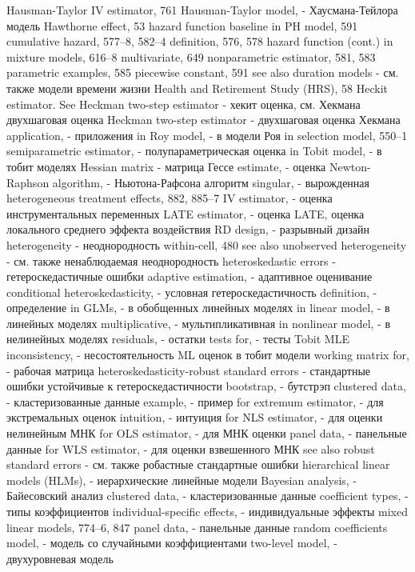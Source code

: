 Hausman-Taylor IV estimator, 761 
Hausman-Taylor model, - Хаусмана-Тейлора модель 
Hawthorne effect, 53
hazard function
baseline in PH model, 591 cumulative hazard, 577–8, 582–4 definition, 576, 578
hazard function (cont.)
in mixture models, 616–8 multivariate, 649
nonparametric estimator, 581, 583 parametric examples, 585 piecewise constant, 591
see also duration models - см. также модели времени жизни
Health and Retirement Study (HRS), 58
Heckit estimator. See Heckman two-step estimator - хекит оценка, см. Хекмана двухшаговая оценка 
Heckman two-step estimator - двухшаговая оценка Хекмана 
application, - приложения
in Roy model, - в модели Роя
in selection model, 550–1 
semiparametric estimator, - полупараметрическая оценка 
in Tobit model, - в тобит моделях
Hessian matrix - матрица Гессе
estimate, - оценка
Newton-Raphson algorithm, - Ньютона-Рафсона алгоритм 
singular, - вырожденная
heterogeneous treatment effects, 882, 885–7 
IV estimator, - оценка инструментальных переменных 
LATE estimator, - оценка LATE, оценка локального среднего эффекта воздействия
RD design, - разрывный дизайн
heterogeneity - неоднородность
within-cell, 480
see also unobserved heterogeneity - см. также ненаблюдаемая неоднородность
heteroskedastic errors - гетероскедастичные ошибки
adaptive estimation, - адаптивное оценивание
conditional heteroskedasticity, - условная гетероскедастичность 
definition, - определение
in GLMs, - в обобщенных линейных моделях
in linear model, - в линейных моделях 
multiplicative, - мультипликативная
in nonlinear model, - в нелинейных моделях 
residuals, - остатки
tests for, - тесты
Tobit MLE inconsistency, - несостоятельность ML оценок в тобит модели 
working matrix for, - рабочая матрица
heteroskedasticity-robust standard errors - стандартные ошибки устойчивые к гетероскедастичности
bootstrap, - бутстрэп
clustered data, - кластеризованные данные
example, - пример
for extremum estimator, - для экстремальных оценок
intuition, - интуиция
for NLS estimator, - для оценки нелинейным МНК
for OLS estimator, - для МНК оценки 
panel data, - панельные данные
for WLS estimator, - для оценки взвешенного МНК
see also robust standard errors - см. также робастные стандартные ошибки
hierarchical linear models (HLMs), - иерархические линейные модели
Bayesian analysis, - Байесовский анализ
clustered data, - кластеризованные данные
coefficient types, - типы коэффициентов 
individual-specific effects, - индивидуальные эффекты 
mixed linear models, 774–6, 847 
panel data, - панельные данные
random coefficients model, - модель со случайными коэффициентами 
two-level model, - двухуровневая модель 
